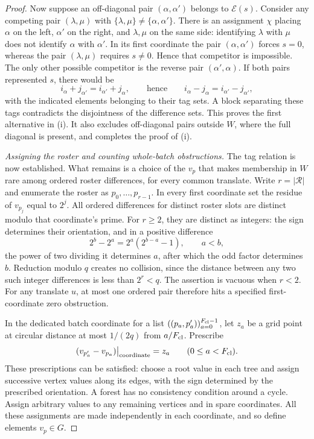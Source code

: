 \begin{proof}
Now suppose an off-diagonal pair $(\alpha,\alpha')$ belongs to
$\mathcal E(s)$.  Consider any competing pair $(\lambda,\mu)$ with
$\{\lambda,\mu\}\ne\{\alpha,\alpha'\}$.  There is an assignment
$\chi$ placing $\alpha$ on the left, $\alpha'$ on the right, and
$\lambda,\mu$ on the same side: identifying $\lambda$ with $\mu$ does
not identify $\alpha$ with $\alpha'$.  In its first coordinate the pair
$(\alpha,\alpha')$ forces $s=0$, whereas the pair $(\lambda,\mu)$
requires $s\ne0$.  Hence that competitor is impossible.  The only other
possible competitor is the reverse pair $(\alpha',\alpha)$.  If both
pairs represented $s$, there would be
\[
 i_\alpha+j_{\alpha'}=i_{\alpha'}+j_\alpha,
 \qquad\text{hence}\qquad
 i_\alpha-j_\alpha=i_{\alpha'}-j_{\alpha'},
\]
with the indicated elements belonging to their tag sets.  A block
separating these tags contradicts the disjointness of the difference
sets.  This proves the first alternative in \textup{(i)}.  It also excludes
off-diagonal pairs outside $W$, where the full diagonal is present, and
completes the proof of \textup{(i)}.

\emph{Assigning the roster and counting whole-batch obstructions.}
The tag relation is now established. What remains is a choice of the
$v_p$ that makes membership in $W$ rare among ordered roster differences,
for every common translate.  Write
$r=|\mathcal R|$ and enumerate the roster as $p_0,\ldots,p_{r-1}$.  In
every first coordinate set the residue of $v_{p_j}$ equal to $2^j$.  All
ordered differences for distinct roster slots are distinct modulo that
coordinate's prime.  For $r\geq2$, they are distinct as integers: the sign
determines their orientation, and in a positive difference
\[
 2^b-2^a=2^a(2^{b-a}-1),\qquad a<b,
\]
the power of two dividing it determines $a$, after which the odd factor
determines $b$.  Reduction modulo $q$ creates no collision, since the
distance between any two such integer differences is less than $2^r<q$.
The assertion is vacuous when $r<2$.  For any translate $u$, at most one
ordered pair therefore hits a specified first-coordinate zero obstruction.

In the dedicated batch coordinate for a list
$((p_a,p'_a))_{a=0}^{F_{\rm cl}-1}$, let $z_a$ be a grid point at circular
distance at most $1/(2q)$ from $a/F_{\rm cl}$.  Prescribe
\[
 (v_{p'_a}-v_{p_a})\big|_{\text{coordinate}}=z_a
 \qquad(0\leq a<F_{\rm cl}).
\]
These prescriptions can be satisfied: choose a root value in each tree
and assign successive vertex values along its edges, with the sign
determined by the prescribed orientation.  A forest has no consistency
condition around a cycle.  Assign arbitrary values to any remaining
vertices and in spare coordinates.  All these assignments are made
independently in each coordinate, and so define elements $v_p\in G$.


\end{proof}

